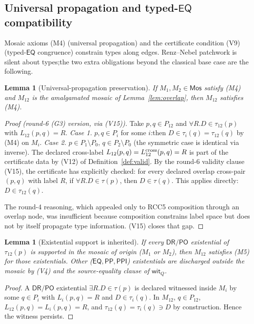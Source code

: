\documentclass[11pt]{article}
\newtheorem{lemma}[theorem]{Lemma}
\newcommand{\EQ}{\mathsf{EQ}}
\newcommand{\DR}{\mathsf{DR}}
\newcommand{\PO}{\mathsf{PO}}
\newcommand{\PP}{\mathsf{PP}}
\newcommand{\PPI}{\mathsf{PPI}}
\newcommand{\Mos}{\mathsf{Mos}}
\begin{document}
\subsection{Universal propagation and typed-\texorpdfstring{$\EQ$}{EQ} compatibility}
\label{ssec:M4-preservation}

Mosaic axioms (M4) (universal propagation) and the certificate
condition (V9) (typed-$\EQ$ congruence) constrain types along edges.
Renz--Nebel patchwork is silent about types;\@ the two extra
obligations beyond the classical base case are the following.

\begin{lemma}[Universal-propagation preservation]\label{lem:M4-preserved}
If $M_1,M_2\in\Mos$ satisfy (M4) and $M_{12}$ is the amalgamated
mosaic of Lemma~\ref{lem:overlap}, then $M_{12}$ satisfies (M4).
\end{lemma}

\begin{proof}[Proof (round-6 (G3) version, via (V15))]
Take $p,q\in P_{12}$ and $\forall R.D\in\tau_{12}(p)$ with
$L_{12}(p,q)=R$.
\emph{Case 1.}  $p,q\in P_i$ for some $i$:\@ then
$D\in\tau_i(q)=\tau_{12}(q)$ by (M4) on $M_i$.
\emph{Case 2.}  $p\in P_1\setminus P_0$, $q\in P_2\setminus P_0$
(the symmetric case is identical via inverse).  The declared
cross-label $L_{12}(p,q)=L_{12}^{\rm cross}(p,q)=R$ is part of the
certificate data by (V12) of Definition~\ref{def:valid}.  By the
round-6 validity clause (V15), the certificate has explicitly
checked: for every declared overlap cross-pair $(p,q)$ with label
$R$, if $\forall R.D\in\tau(p)$, then $D\in\tau(q)$.  This applies
directly: $D\in\tau_{12}(q)$.

The round-4 reasoning, which appealed only to RCC5 composition
through an overlap node, was insufficient because composition
constrains label space but does not by itself propagate type
information.  (V15) closes that gap.
\end{proof}

\begin{lemma}[Existential support is inherited]\label{lem:M5-inherited}
If every $\DR/\PO$ existential of $\tau_{12}(p)$ is supported in
the mosaic of origin ($M_1$ or $M_2$), then $M_{12}$ satisfies (M5)
for those existentials.  Other ($\EQ,\PP,\PPI$) existentials are
discharged outside the mosaic by (V4) and the source-equality clause
of $\mathsf{wit}_Q$.
\end{lemma}

\begin{proof}
A $\DR/\PO$ existential $\exists R.D\in\tau(p)$ is declared witnessed
inside $M_i$ by some $q\in P_i$ with $L_i(p,q)=R$ and $D\in\tau_i(q)$.
In $M_{12}$, $q\in P_{12}$, $L_{12}(p,q)=L_i(p,q)=R$, and
$\tau_{12}(q)=\tau_i(q)\ni D$ by construction.  Hence the witness
persists.
\end{proof}
\end{document}
